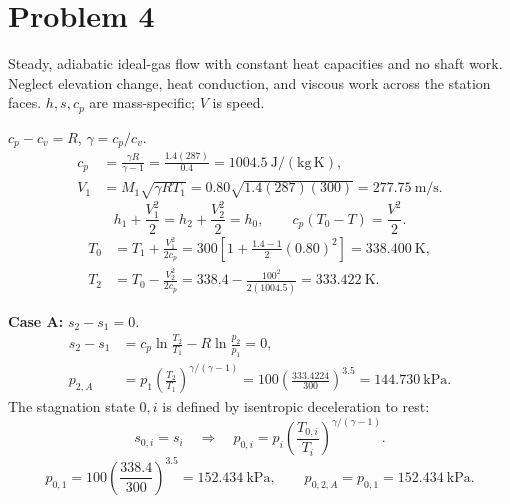 \section*{Problem 4}

Steady, adiabatic ideal-gas flow with constant heat capacities and no shaft work.
Neglect elevation change, heat conduction, and viscous work across the station faces.
$h,s,c_p$ are mass-specific; $V$ is speed.

$c_p-c_v=R$, $\gamma=c_p/c_v$.
\begin{align*}
c_p&=\frac{\gamma R}{\gamma-1}
=\frac{1.4(287)}{0.4}=1004.5~\mathrm{J/(kg\,K)},\\
V_1&=M_1\sqrt{\gamma RT_1}
=0.80\sqrt{1.4(287)(300)}
=\boxed{277.75~\mathrm{m/s}}.
\end{align*}
\[
h_1+\frac{V_1^2}{2}=h_2+\frac{V_2^2}{2}=h_0,
\qquad c_p(T_0-T)=\frac{V^2}{2}.
\]
\begin{align*}
T_0&=T_1+\frac{V_1^2}{2c_p}
=300\left[1+\frac{1.4-1}{2}(0.80)^2\right]
=\boxed{338.400~\mathrm{K}},\\
T_2&=T_0-\frac{V_2^2}{2c_p}
=338.4-\frac{100^2}{2(1004.5)}
=\boxed{333.422~\mathrm{K}}.
\end{align*}

\textbf{Case A:} $s_2-s_1=0$.
\begin{align*}
s_2-s_1&=c_p\ln\frac{T_2}{T_1}-R\ln\frac{p_2}{p_1}=0,\\
p_{2,A}&=p_1\left(\frac{T_2}{T_1}\right)^{\gamma/(\gamma-1)}
=100\left(\frac{333.4224}{300}\right)^{3.5}
=\boxed{144.730~\mathrm{kPa}}.
\end{align*}
The stagnation state $0,i$ is defined by isentropic deceleration to rest:
\[
s_{0,i}=s_i\quad\Longrightarrow\quad
p_{0,i}=p_i\left(\frac{T_{0,i}}{T_i}\right)^{\gamma/(\gamma-1)}.
\]
\[
p_{0,1}=100\left(\frac{338.4}{300}\right)^{3.5}
=\boxed{152.434~\mathrm{kPa}},\qquad
\boxed{p_{0,2,A}=p_{0,1}=152.434~\mathrm{kPa}}.
\]

